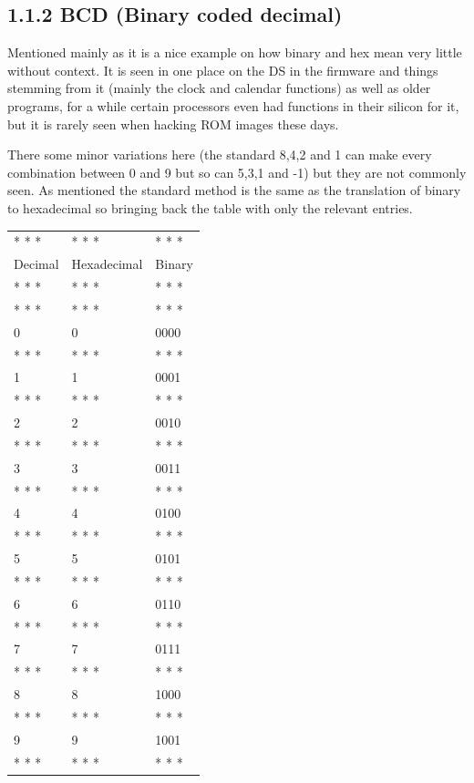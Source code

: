 \documentclass[
]{book}
\begin{document}
\hypertarget{bcd-binary-coded-decimal}{%
\subsection{1.1.2 BCD (Binary coded decimal)}\label{bcd-binary-coded-decimal}}

Mentioned mainly as it is a nice example on how binary and hex mean very little without context. It is seen in one place on the DS in the firmware and things stemming from it (mainly the clock and calendar functions) as well as older programs, for a while certain processors even had functions in their silicon for it, but it is rarely seen when hacking ROM images these days.

There some minor variations here (the standard 8,4,2 and 1 can make every combination between 0 and 9 but so can 5,3,1 and -1) but they are not commonly seen. As mentioned the standard method is the same as the translation of binary to hexadecimal so bringing back the table with only the relevant entries.

\begin{longtable}[]{@{}lll@{}}
\toprule()
\endhead
* * * & * * * & * * * \\
Decimal & Hexadecimal & Binary \\
* * * & * * * & * * * \\
* * * & * * * & * * * \\
0 & 0 & 0000 \\
* * * & * * * & * * * \\
1 & 1 & 0001 \\
* * * & * * * & * * * \\
2 & 2 & 0010 \\
* * * & * * * & * * * \\
3 & 3 & 0011 \\
* * * & * * * & * * * \\
4 & 4 & 0100 \\
* * * & * * * & * * * \\
5 & 5 & 0101 \\
* * * & * * * & * * * \\
6 & 6 & 0110 \\
* * * & * * * & * * * \\
7 & 7 & 0111 \\
* * * & * * * & * * * \\
8 & 8 & 1000 \\
* * * & * * * & * * * \\
9 & 9 & 1001 \\
* * * & * * * & * * * \\
\bottomrule()
\end{longtable}
\end{document}

